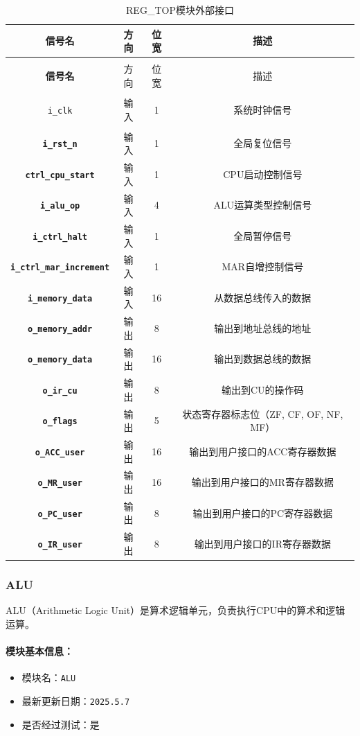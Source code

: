 \documentclass[lang=cn,a4paper,newtx]{elegantpaper}
\begin{document}
\begin{longtable}{>{\bfseries}c c c c}
  \caption{REG\_TOP模块外部接口} \\ 
  \toprule
  信号名 & 方向 & 位宽 & 描述 \\ 
  \midrule
  \endfirsthead

  \multicolumn{4}{l}{\textbf{（续表）REG\_TOP模块外部接口}} \\ 
  \toprule
  信号名 & 方向 & 位宽 & 描述 \\ 
  \midrule
  \endhead

  \texttt{i\_clk} & 输入 & 1 & 系统时钟信号 \\ 
  \texttt{i\_rst\_n} & 输入 & 1 & 全局复位信号 \\ 
  \texttt{ctrl\_cpu\_start} & 输入 & 1 & CPU启动控制信号 \\ 
  \texttt{i\_alu\_op} & 输入 & 4 & ALU运算类型控制信号 \\ 
  \texttt{i\_ctrl\_halt} & 输入 & 1 & 全局暂停信号 \\ 
  \texttt{i\_ctrl\_mar\_increment} & 输入 & 1 & MAR自增控制信号 \\ 
  \texttt{i\_memory\_data} & 输入 & 16 & 从数据总线传入的数据 \\ 
  \texttt{o\_memory\_addr} & 输出 & 8 & 输出到地址总线的地址 \\ 
  \texttt{o\_memory\_data} & 输出 & 16 & 输出到数据总线的数据 \\ 
  \texttt{o\_ir\_cu} & 输出 & 8 & 输出到CU的操作码 \\ 
  \texttt{o\_flags} & 输出 & 5 & 状态寄存器标志位（ZF, CF, OF, NF, MF） \\ 
  \texttt{o\_ACC\_user} & 输出 & 16 & 输出到用户接口的ACC寄存器数据 \\ 
  \texttt{o\_MR\_user} & 输出 & 16 & 输出到用户接口的MR寄存器数据 \\ 
  \texttt{o\_PC\_user} & 输出 & 8 & 输出到用户接口的PC寄存器数据 \\ 
  \texttt{o\_IR\_user} & 输出 & 8 & 输出到用户接口的IR寄存器数据 \\ 
  \bottomrule
\end{longtable}
\subsubsection{ALU}
ALU（Arithmetic Logic Unit）是算术逻辑单元，负责执行CPU中的算术和逻辑运算。

\paragraph{模块基本信息：}
\begin{itemize}
  \item 模块名：\texttt{ALU}
  \item 最新更新日期：\texttt{2025.5.7}
  \item 是否经过测试：是
\end{itemize}
\end{document}
